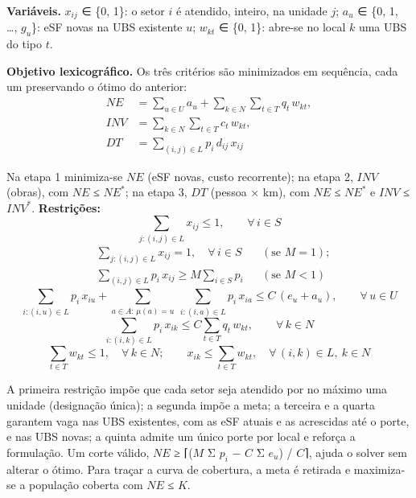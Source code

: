 \documentclass[11pt,a4paper]{article}
\begin{document}
\textbf{Variáveis.} $x_{ij}$ ∈ \{0, 1\}: o setor $i$ é atendido, inteiro, na unidade $j$; $a_{u}$ ∈ \{0, 1, …, $g_{u}$\}: eSF novas na UBS existente $u$; $w_{kt}$ ∈ \{0, 1\}: abre-se no local $k$ uma UBS do tipo $t$.

\textbf{Objetivo lexicográfico.} Os três critérios são minimizados em sequência, cada um preservando o ótimo do anterior:
\begin{equation}
\begin{aligned} \mathit{NE} &= \sum_{u \in U} a_u + \sum_{k \in N} \sum_{t \in T} q_t\, w_{kt}, \\ \mathit{INV} &= \sum_{k \in N} \sum_{t \in T} c_t\, w_{kt}, \\ \mathit{DT} &= \sum_{(i,j) \in L} p_i\, d_{ij}\, x_{ij} \end{aligned}
\end{equation}

Na etapa 1 minimiza-se $\mathit{NE}$ (eSF novas, custo recorrente); na etapa 2, $\mathit{INV}$ (obras), com $\mathit{NE}$ ≤ $\mathit{NE}^{*}$; na etapa 3, $\mathit{DT}$ (pessoa × km), com $\mathit{NE}$ ≤ $\mathit{NE}^{*}$ e $\mathit{INV}$ ≤ $\mathit{INV}^{*}$. \textbf{Restrições:}
\begin{equation}
\sum_{j:(i,j) \in L} x_{ij} \leq 1, \qquad \forall\, i \in S
\end{equation}
\begin{equation}
\begin{aligned} &\sum_{j:(i,j) \in L} x_{ij} = 1, \quad \forall\, i \in S && (\text{se } M = 1); \\ &\sum_{(i,j) \in L} p_i\, x_{ij} \geq M \sum_{i \in S} p_i && (\text{se } M < 1) \end{aligned}
\end{equation}
\begin{equation}
\sum_{i:(i,u) \in L} p_i\, x_{iu} + \sum_{a \in A:\, \mu(a) = u}\ \sum_{i:(i,a) \in L} p_i\, x_{ia} \leq C\,(e_u + a_u), \qquad \forall\, u \in U
\end{equation}
\begin{equation}
\sum_{i:(i,k) \in L} p_i\, x_{ik} \leq C \sum_{t \in T} q_t\, w_{kt}, \qquad \forall\, k \in N
\end{equation}
\begin{equation}
\sum_{t \in T} w_{kt} \leq 1, \quad \forall\, k \in N; \qquad x_{ik} \leq \sum_{t \in T} w_{kt}, \quad \forall\, (i,k) \in L,\ k \in N
\end{equation}

A primeira restrição impõe que cada setor seja atendido por no máximo uma unidade (designação única); a segunda impõe a meta; a terceira e a quarta garantem vaga nas UBS existentes, com as eSF atuais e as acrescidas até o porte, e nas UBS novas; a quinta admite um único porte por local e reforça a formulação. Um corte válido, $\mathit{NE}$ ≥ ⌈($M$ Σ $p_{i}$ − $C$ Σ $e_{u}$) / $C$⌉, ajuda o solver sem alterar o ótimo. Para traçar a curva de cobertura, a meta é retirada e maximiza-se a população coberta com $\mathit{NE}$ ≤ $K$.
\end{document}
